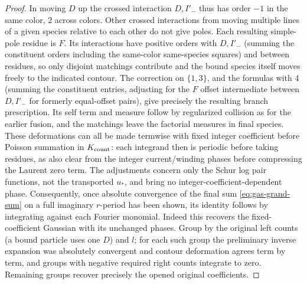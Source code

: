 \begin{proof}
In moving \(D\) up the crossed interaction \(D,I'_-\) thus has order \(-1\) in the same color, 2 across colors. Other crossed interactions from moving multiple lines of a given species relative to each other do not give poles. Each resulting simple-pole residue is \(F\). Its interactions have positive orders with \(D,I'_-\) (summing the constituent orders including the same-color same-species squares) and between residues, so only disjoint matchings contribute and the bound species itself moves freely to the indicated contour. The correction on \(\{1,3\}\), and the formulas with 4 (summing the constituent entries, adjusting for the \(F\) offset intermediate between \(D,I'_-\) for formerly equal-offset pairs), give precisely the resulting branch prescription. Its self term and measure follow by regularized collision as for the earlier fusion, and the matchings leave the factorial measures in final species. These deformations can all be made termwise with fixed integer coefficient before Poisson summation in \(K_{\rm count}\): each integrand then is periodic before taking residues, as also clear from the integer current/winding phases before compressing the Laurent zero term. The adjustments concern only the Schur log pair functions, not the transported \(u_*\), and bring no integer-coefficient-dependent phase. Consequently, once absolute convergence of the final sum \eqref{eq:gas-grand-sum} on a full imaginary \(r\)-period has been shown, its identity follows by integrating against each Fourier monomial. Indeed this recovers the fixed-coefficient Gaussian with its unchanged phases. Group by the original left counts (a bound particle uses one \(D\)) and \(l\); for each such group the preliminary inverse expansion was absolutely convergent and contour deformation agrees term by term, and groups with negative required right counts integrate to zero. Remaining groups recover precisely the opened original coefficients.


\end{proof}
